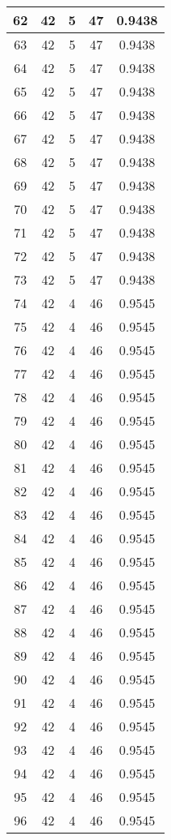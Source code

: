 \documentclass[letterpaper, 12pt]{article}
\begin{document}
\begin{longtable}{|c|c|c|c|c|}
\hline
62 & 42 & 5 & 47 & 0.9438 \\
\hline
63 & 42 & 5 & 47 & 0.9438 \\
\hline
64 & 42 & 5 & 47 & 0.9438 \\
\hline
65 & 42 & 5 & 47 & 0.9438 \\
\hline
66 & 42 & 5 & 47 & 0.9438 \\
\hline
67 & 42 & 5 & 47 & 0.9438 \\
\hline
68 & 42 & 5 & 47 & 0.9438 \\
\hline
69 & 42 & 5 & 47 & 0.9438 \\
\hline
70 & 42 & 5 & 47 & 0.9438 \\
\hline
71 & 42 & 5 & 47 & 0.9438 \\
\hline
72 & 42 & 5 & 47 & 0.9438 \\
\hline
73 & 42 & 5 & 47 & 0.9438 \\
\hline
74 & 42 & 4 & 46 & 0.9545 \\
\hline
75 & 42 & 4 & 46 & 0.9545 \\
\hline
76 & 42 & 4 & 46 & 0.9545 \\
\hline
77 & 42 & 4 & 46 & 0.9545 \\
\hline
78 & 42 & 4 & 46 & 0.9545 \\
\hline
79 & 42 & 4 & 46 & 0.9545 \\
\hline
80 & 42 & 4 & 46 & 0.9545 \\
\hline
81 & 42 & 4 & 46 & 0.9545 \\
\hline
82 & 42 & 4 & 46 & 0.9545 \\
\hline
83 & 42 & 4 & 46 & 0.9545 \\
\hline
84 & 42 & 4 & 46 & 0.9545 \\
\hline
85 & 42 & 4 & 46 & 0.9545 \\
\hline
86 & 42 & 4 & 46 & 0.9545 \\
\hline
87 & 42 & 4 & 46 & 0.9545 \\
\hline
88 & 42 & 4 & 46 & 0.9545 \\
\hline
89 & 42 & 4 & 46 & 0.9545 \\
\hline
90 & 42 & 4 & 46 & 0.9545 \\
\hline
91 & 42 & 4 & 46 & 0.9545 \\
\hline
92 & 42 & 4 & 46 & 0.9545 \\
\hline
93 & 42 & 4 & 46 & 0.9545 \\
\hline
94 & 42 & 4 & 46 & 0.9545 \\
\hline
95 & 42 & 4 & 46 & 0.9545 \\
\hline
96 & 42 & 4 & 46 & 0.9545 \\

\end{longtable}
\end{document}
